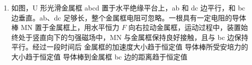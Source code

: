 \documentclass[\gkver]{gaokaozhenti}
\begin{document}
\begin{enumerate}
{B．斜面高 $3\Um$、长 $5\Um$，则斜面倾角为 $\theta=37^\circ$。令斜面底端为零势面，则物块在斜面顶端时的重力势能 $mgh=30\UJ$，可得质量 $m=1\Ukg$。

下滑 $5\Um$ 过程中，由功能原理，机械能的减少量等于克服摩擦力做的功

$\mu mg\cos\theta\cdot s=20\UJ$

求得 $\mu=0.5$。B 正确；

C．由牛顿第二定律 $mg\sin\theta-\mu mg\cos\theta=ma$，求得 $a=2\Umsq$。C 错误；

D．物块下滑 $2.0\Um$ 时，重力势能减少 $12\UJ$，动能增加 $4\UJ$，所以机械能损失了 $8\UJ$，D 选项错误。

故选 AB。
}

\item
如图，U 形光滑金属框 abcd 置于水平绝缘平台上，ab 和 dc 边平行，和 bc 边垂直。ab、dc 足够长，整个金属框电阻可忽略。一根具有一定电阻的导体棒 MN 置于金属框上，用水平恒力 $F$ 向右拉动金属框，运动过程中，装置始终处于竖直向下的匀强磁场中，MN 与金属框保持良好接触，且与 bc 边保持平行。经过一段时间后
{金属框的加速度大小趋于恒定值}
{导体棒所受安培力的大小趋于恒定值}
{导体棒到金属框 bc 边的距离趋于恒定值}
\end{enumerate}
\end{document}
